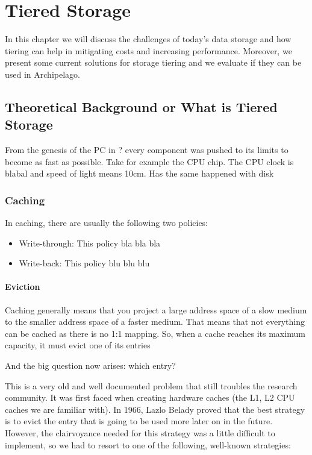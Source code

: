 \chapter{Tiered Storage}\label{ch:tiering}

In this chapter we will discuss the challenges of today's data storage and how 
tiering can help in mitigating costs and increasing performance. Moreover, we 
present some current solutions for storage tiering and we evaluate if they can 
be used in Archipelago.

\section{Theoretical Background or What is Tiered Storage}

From the genesis of the PC in ? every component was pushed to its limits to 
become as fast as possible. Take for example the CPU chip. The CPU clock is 
blabal and speed of light means 10cm. Has the same happened with disk

\subsection{Caching}

In caching, there are usually the following two policies:

\begin{itemize}
	\item Write-through:
		This policy bla bla bla
	\item Write-back:
		This policy blu blu blu
\end{itemize}

\subsubsection{Eviction}

Caching generally means that you project a large address space of a slow medium 
to the smaller address space of a faster medium. That means that not everything 
can be cached as there is no 1:1 mapping. So, when a cache reaches its maximum 
capacity, it must evict one of its entries

And the big question now arises: which entry?

This is a very old and well documented problem that still troubles the research 
community. It was first faced when creating hardware caches (the L1, L2 CPU 
caches we are familiar with). In 1966, Lazlo Belady proved that the best 
strategy is to evict the entry that is going to be used more later on in the 
future\cite{Belady}.  However, the clairvoyance needed for this strategy was a 
little difficult to implement, so we had to resort to one of the following, 
well-known strategies:

